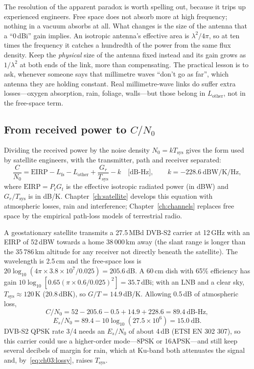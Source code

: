 The resolution of the apparent paradox is worth spelling out, because it trips up experienced engineers.
Free space does not absorb more at high frequency; nothing in a vacuum absorbs at all. What changes is the
size of the antenna that a ``0\,dBi'' gain implies. An isotropic antenna's effective area is
$\lambda^2/4\pi$, so at ten times the frequency it catches a hundredth of the power from the same flux
density. Keep the \emph{physical} size of the antenna fixed instead and its gain grows as $1/\lambda^2$ at
both ends of the link, more than compensating. The practical lesson is to ask, whenever someone says that
millimetre waves ``don't go as far'', which antenna they are holding constant. Real millimetre-wave links do
suffer extra losses---oxygen absorption, rain, foliage, walls---but those belong in $L_{\text{other}}$, not in
the free-space term.

\subsection{From received power to \texorpdfstring{$C/N_0$}{C/N0}}


Dividing the received power by the noise density $N_0=kT_{\text{sys}}$ gives the form used by satellite
engineers, with the transmitter, path and receiver separated:
\begin{equation}
\frac{C}{N_0}=\mathrm{EIRP}-L_{\text{fs}}-L_{\text{other}}+\frac{G_r}{T_{\text{sys}}}-k\quad\text{[dB-Hz]},
\qquad k=-228.6\ \mathrm{dBW/K/Hz},
\label{eq:ch03:cn0}
\end{equation}
where $\mathrm{EIRP}=P_tG_t$ is the effective isotropic radiated power (in dBW) and $G_r/T_{\text{sys}}$ is in
dB/K. Chapter~\ref{ch:satellite} develops this equation with atmospheric losses, rain and interference;
Chapter~\ref{ch:channels} replaces free space by the empirical path-loss models of terrestrial radio.

\begin{worked}
A geostationary satellite transmits a 27.5\,MBd DVB-S2 carrier at 12\,GHz with an EIRP of 52\,dBW towards a
home 38\,000\,km away (the slant range is longer than the 35\,786\,km altitude for any receiver not directly
beneath the satellite). The wavelength is 2.5\,cm and the free-space loss is
$20\log_{10}(4\pi\times3.8\times10^7/0.025)=205.6$\,dB. A 60\,cm dish with 65\% efficiency has gain
$10\log_{10}[0.65(\pi\times0.6/0.025)^2]=35.7$\,dBi; with an LNB and a clear sky, $T_{\text{sys}}\approx120$\,K
(20.8\,dBK), so $G/T=14.9$\,dB/K. Allowing 0.5\,dB of atmospheric loss,
\[
C/N_0=52-205.6-0.5+14.9+228.6=89.4\ \text{dB-Hz},
\]
\[
E_s/N_0=89.4-10\log_{10}(27.5\times10^6)=15.0\ \text{dB}.
\]
DVB-S2 QPSK rate 3/4 needs an $E_s/N_0$ of about 4\,dB (ETSI EN 302 307), so this carrier could use a
higher-order mode---8PSK or 16APSK---and still keep several decibels of margin for rain, which at Ku-band both
attenuates the signal and, by~\eqref{eq:ch03:lossy}, raises $T_{\text{sys}}$.
\end{worked}

